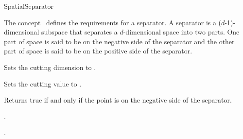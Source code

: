 

\begin{ccRefConcept}{SpatialSeparator}

\begin{ccAdvanced}


\ccDefinition
  
The concept \ccRefName\ defines the requirements for a separator.
A separator is a ($d$-1)-dimensional subspace that separates a $d$-dimensional space into two parts.
One part of space is said to be on the negative side of the separator and the other part of space is 
said to be on the positive side of the separator.

\ccTypes


\ccCreation
{}  %


\ccOperations

{Sets the cutting dimension to . }

{Sets the cutting value to . }





{Returns true if and only if the point  is on the negative side of the separator.}


\ccHasModels

.

\ccSeeAlso

.

\end{ccAdvanced}

\end{ccRefConcept}


